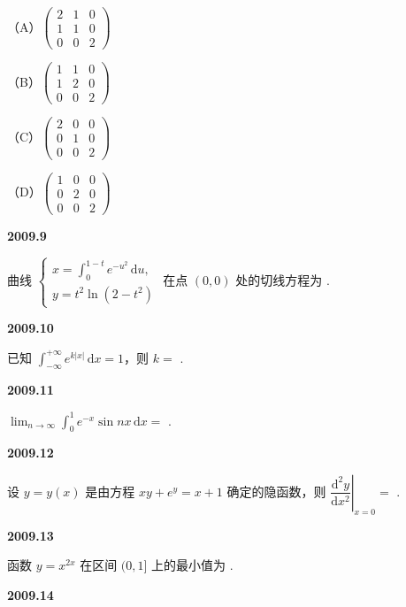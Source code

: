 \documentclass[UTF8,12pt,fontset=windows]{ctexart}
\begin{document}
（A）$\begin{pmatrix} 2 & 1 & 0 \\ 1 & 1 & 0 \\ 0 & 0 & 2 \end{pmatrix}$

（B）$\begin{pmatrix} 1 & 1 & 0 \\ 1 & 2 & 0 \\ 0 & 0 & 2 \end{pmatrix}$

（C）$\begin{pmatrix} 2 & 0 & 0 \\ 0 & 1 & 0 \\ 0 & 0 & 2 \end{pmatrix}$

（D）$\begin{pmatrix} 1 & 0 & 0 \\ 0 & 2 & 0 \\ 0 & 0 & 2 \end{pmatrix}$

\vfill
\newpage
{\large\bfseries 2009.9}

曲线 $\begin{cases} x = \int_0^{1-t} e^{-u^2} \,\mathrm{d}u, \\ y = t^2 \ln(2 - t^2) \end{cases}$ 在点 $(0, 0)$ 处的切线方程为 \underline{\hspace{20mm}}.

\vfill
\newpage
{\large\bfseries 2009.10}

已知 $\int_{-\infty}^{+\infty} e^{k|x|} \,\mathrm{d}x = 1$，则 $k =$ \underline{\hspace{20mm}}.

\vfill
\newpage
{\large\bfseries 2009.11}

$\lim_{n \to \infty} \int_0^1 e^{-x} \sin nx \,\mathrm{d}x =$ \underline{\hspace{20mm}}.

\vfill
\newpage
{\large\bfseries 2009.12}

设 $y = y(x)$ 是由方程 $xy + e^y = x + 1$ 确定的隐函数，则 $\left. \dfrac{\mathrm{d}^2 y}{\mathrm{d}x^2} \right|_{x=0} =$ \underline{\hspace{20mm}}.

\vfill
\newpage
{\large\bfseries 2009.13}

函数 $y = x^{2x}$ 在区间 $(0, 1]$ 上的最小值为 \underline{\hspace{20mm}}.

\vfill
\newpage
{\large\bfseries 2009.14}
\end{document}
